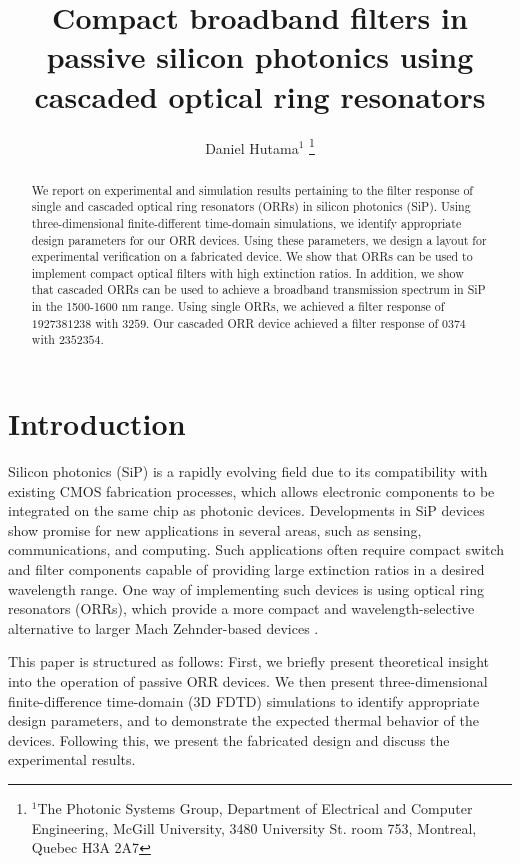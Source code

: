\documentclass[letterpaper, 10 pt, conference]{ieeeconf}
\title{\LARGE \bf
Compact broadband filters in passive silicon photonics using cascaded optical ring resonators
}
\author{Daniel Hutama$^{1}$ %
\thanks{$^{1}$The Photonic Systems Group, Department of Electrical and Computer Engineering, McGill University, 3480 University St. room 753, Montreal, Quebec H3A 2A7}
}
\begin{document}
\maketitle
\thispagestyle{empty}
\pagestyle{empty}


\begin{abstract}


We report on experimental and simulation results pertaining to the filter response of single and cascaded optical ring resonators (ORRs) in silicon photonics (SiP). Using three-dimensional finite-different time-domain simulations, we identify appropriate design parameters for our ORR devices. Using these parameters, we design a layout for experimental verification on a fabricated device. We show that ORRs can be used to implement compact optical filters with high extinction ratios. In addition, we show that cascaded ORRs can be used to achieve a broadband transmission spectrum in SiP in the 1500-1600 nm range. Using single ORRs, we achieved a filter response of $1927381238$ with $3259$. Our cascaded ORR device achieved a filter response of $0374$ with $2352354$.
\end{abstract}


\section{Introduction}

Silicon photonics (SiP) is a rapidly evolving field due to its compatibility with existing CMOS fabrication processes, which allows electronic components to be integrated on the same chip as photonic devices. Developments in SiP devices show promise for new applications in several areas, such as sensing, communications, and computing. Such applications often require compact switch and filter components capable of providing large extinction ratios in a desired wavelength range. One way of implementing such devices is using optical ring resonators (ORRs), which provide a more compact and wavelength-selective alternative to larger Mach Zehnder-based devices \cite{SIPORR}. 

This paper is structured as follows: First, we briefly present theoretical insight into the operation of passive ORR devices. We then present three-dimensional finite-difference time-domain (3D FDTD) simulations to identify appropriate design parameters, and to demonstrate the expected thermal behavior of the devices. Following this, we present the fabricated design and discuss the experimental results.
\end{document}
